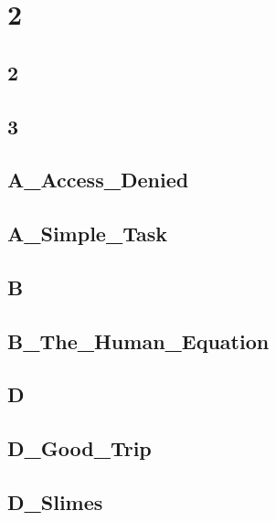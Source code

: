 \section{2}
\subsection{2}
\raggedbottom
\hrulefill

\subsection{3}
\raggedbottom
\hrulefill

\subsection{A_Access_Denied}
\raggedbottom
\hrulefill

\subsection{A_Simple_Task}
\raggedbottom
\hrulefill

\subsection{B}
\raggedbottom
\hrulefill

\subsection{B_The_Human_Equation}
\raggedbottom
\hrulefill

\subsection{D}
\raggedbottom
\hrulefill

\subsection{D_Good_Trip}
\raggedbottom
\hrulefill

\subsection{D_Slimes}
\raggedbottom
\hrulefill

